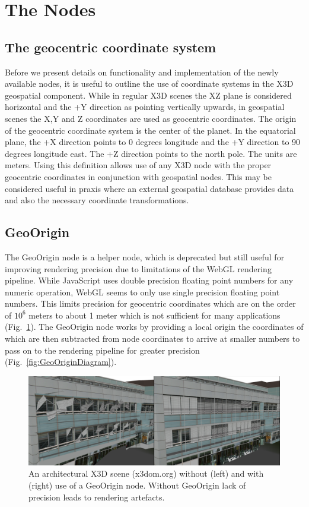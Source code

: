 \documentclass{acmsiggraph}                     %
\begin{document}
\section{The Nodes}

\subsection{The geocentric coordinate system}

Before we present details on functionality and implementation of the newly available nodes, it is
useful to outline the use of coordinate systems in the X3D geospatial component. While in regular
X3D scenes the XZ plane is considered horizontal and the +Y direction as pointing vertically
upwards, in geospatial scenes the X,Y and Z coordinates are used as geocentric coordinates. The
origin of the geocentric coordinate system is the center of the planet. 
In the equatorial plane, the +X direction points to 0 degrees longitude
and the +Y direction to 90 degrees longitude east. The +Z direction points
to the north pole.
The units are meters. Using this definition allows use of any X3D node with
the proper geocentric coordinates in conjunction with geospatial nodes. This may be considered
useful in praxis where an external geospatial database provides data and also the necessary
coordinate transformations.

\subsection{GeoOrigin}

The GeoOrigin node is a helper node, which is deprecated but still useful for improving rendering
precision due to limitations of the WebGL rendering pipeline. While JavaScript uses double precision
floating point numbers for any numeric operation, WebGL seems to only use single precision floating
point numbers. This limits precision for geocentric coordinates which are on the order of $10^{6}$
meters to about 1 meter which is not sufficient for many applications
(Fig.~\ref{fig:GeoOriginImage}). The GeoOrigin node works by providing a local origin the
coordinates of which are then subtracted from node coordinates to arrive at smaller numbers to pass
on to the rendering pipeline for greater precision (Fig.~\ref{fig:GeoOriginDiagram}).

\begin{figure}[htbp] \centering \includegraphics[width=6.6in]{GeoOriginImage.png} \caption{An
  architectural X3D scene (x3dom.org) without (left) and with (right) use of a GeoOrigin node.
Without GeoOrigin lack of precision leads to rendering artefacts.} \label{fig:GeoOriginImage}
\end{figure}
\end{document}
